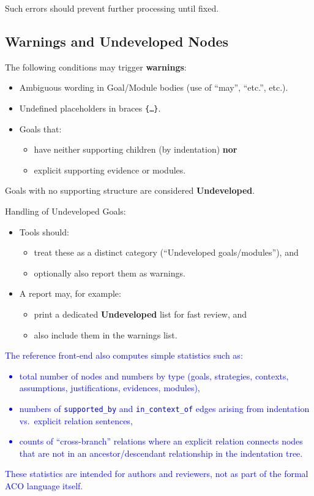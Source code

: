\documentclass[11pt]{article}
\begin{document}
Such errors should prevent further processing until fixed.

\subsection{Warnings and Undeveloped Nodes}

The following conditions may trigger \textbf{warnings}:

\begin{itemize}[leftmargin=2em]
  \item Ambiguous wording in Goal/Module bodies (use of ``may'', ``etc.'', etc.).
  \item Undefined placeholders in braces \texttt{\{\dots\}}.
  \item Goals that:
  \begin{itemize}[leftmargin=1.5em]
    \item have neither supporting children (by indentation) \textbf{nor}
    \item explicit supporting evidence or modules.
  \end{itemize}
\end{itemize}

Goals with no supporting structure are considered \textbf{Undeveloped}.

Handling of Undeveloped Goals:

\begin{itemize}[leftmargin=2em]
  \item Tools should:
  \begin{itemize}[leftmargin=1.5em]
    \item treat these as a distinct category (``Undeveloped goals/modules''), and
    \item optionally also report them as warnings.
  \end{itemize}
  \item A report may, for example:
  \begin{itemize}[leftmargin=1.5em]
    \item print a dedicated \textbf{Undeveloped} list for fast review, and
    \item also include them in the warnings list.
  \end{itemize}
\end{itemize}

\textcolor{blue}{The reference front-end also computes simple statistics such as:
\begin{itemize}[leftmargin=2em]
  \item total number of nodes and numbers by type (goals, strategies, contexts, assumptions, justifications, evidences, modules),
  \item numbers of \texttt{supported\_by} and \texttt{in\_context\_of} edges arising from indentation vs.\ explicit relation sentences,
  \item counts of ``cross-branch'' relations where an explicit relation connects nodes that are not in an ancestor/descendant relationship in the indentation tree.
\end{itemize}
These statistics are intended for authors and reviewers, not as part of the formal ACO language itself.}
\end{document}
